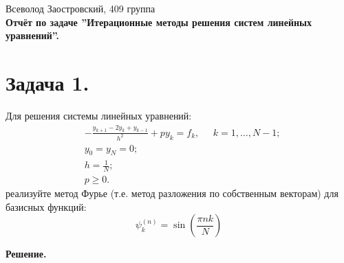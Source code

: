\documentclass[14pt,a4paper]{extarticle}
\newcommand{\1}{\mathbbm{1}}
\begin{document}
\begin{center}

    {Всеволод Заостровский, 409 группа}\\
    {\bfseries Отчёт по задаче ''Итерационные методы решения систем линейных уравнений''.\\}
    \vspace{1cm}

\end{center}

\section{\textbf{Задача 1.}} Для решения системы линейных уравнений:
\begin{align*}
& -\frac{y_{k+1} - 2 y_k + y_{k-1}}{h^2} + p y_k = f_k, \;\;\;\;\; k = 1, \ldots, N - 1; \\
& y_0 = y_N = 0; \\
& h = \frac{1}{N}; \\
& p \geq 0.
\end{align*}
реализуйте метод Фурье (т.е. метод разложения по собственным векторам) для базисных функций:
\begin{equation}
    \psi_k^{(n)} = \sin(\frac{\pi n k}{N})
\end{equation}    

\textbf{Решение.} 
\end{document}
